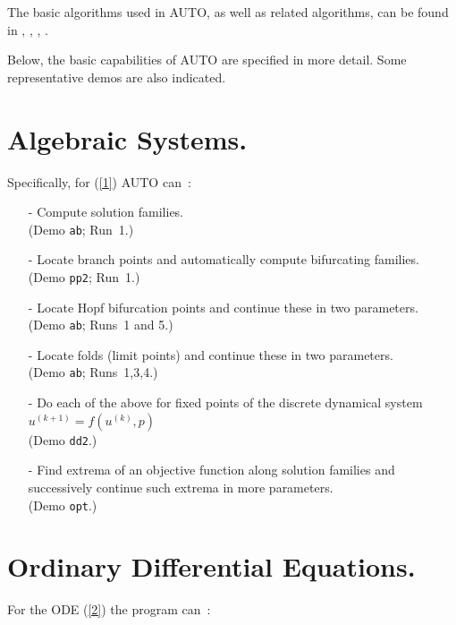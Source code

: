 \documentclass[12pt]{report}
\begin{document}
The basic algorithms used in {\cal AUTO},
as well as related algorithms, can be found in 
 \citeyear{HBK:77},
 \citeyear{HBK:86},
 \citeyear{DoKeKe:91a},
 \citeyear{DoKeKe:91b}.

Below, the basic capabilities of {\cal AUTO} are specified in more detail.
Some representative demos are also indicated.
 
\section{ Algebraic Systems.} \label{sec:algebraic_systems}
Specifically, for (\ref{1}) {\cal AUTO} can~:~
 
\begin{itemize}
\item[-]
  Compute solution families.\\  (Demo {\tt ab}; Run~1.) 
\item[-]
  Locate branch points and automatically compute
  bifurcating families. \\ (Demo {\tt pp2}; Run~1.)
\item[-]
  Locate Hopf bifurcation points and continue these in two
  parameters. \\ (Demo {\tt ab}; Runs~1 and 5.)
\item[-]
  Locate folds (limit points) and continue these 
  in two parameters. \\(Demo {\tt ab}; Runs~1,3,4.)
\item[-]
  Do each of the above for fixed points
  of the discrete dynamical system 
  $u^{(k+1)}= f( u^{(k)}, p )$ \\ (Demo {\tt dd2}.)
\item[-]
  Find extrema of an objective function along solution families
  and successively continue such extrema in more parameters.
  \\ (Demo {\tt opt}.)
\end{itemize}


\section{ Ordinary Differential Equations.} \label{sec:ODEs}
For the ODE (\ref{2}) the program can~:~
 
\end{document}
